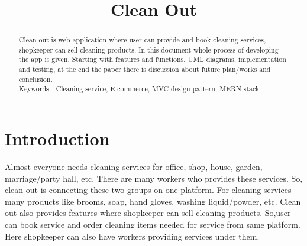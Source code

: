 \documentclass[conference]{IEEEtran}
\begin{document}
\title{Clean Out}

\author{
\and
{}
\and
{}
}
\maketitle

\pagestyle{fancy} %



\begin{abstract}
Clean out is web-application where user can provide and book cleaning services, shopkeeper can sell cleaning products. In this document whole process of developing the app is given. Starting with features and functions, UML diagrams, implementation and testing, at the end the paper there is discussion about future plan/works and conclusion. \\

Keywords - Cleaning service, E-commerce, MVC design pattern, MERN stack\\

\end{abstract}





\section{Introduction}
\thispagestyle{footer}
Almost everyone needs cleaning services for office, shop, house, garden, marriage/party hall, etc. There are many workers who provides these services. So, clean out is connecting these two groups on one platform. For cleaning services many products like brooms, soap, hand gloves, washing liquid/powder, etc. Clean out also provides features where shopkeeper can sell cleaning products. So,user can book service and order cleaning items needed for service from same platform. Here shopkeeper can also have workers providing services under them.\\ 
\end{document}
